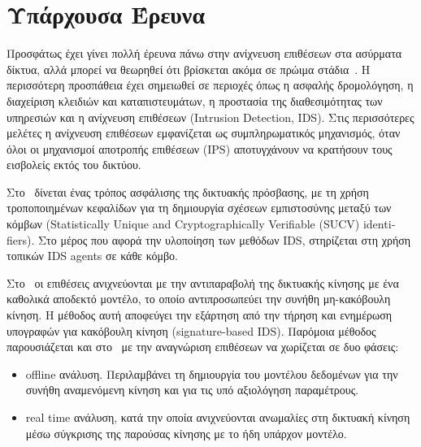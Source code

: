 \documentclass[12pt]{report}
\begin{document}
\section{Υπάρχουσα Έρευνα}
Προσφάτως έχει γίνει πολλή έρευνα πάνω στην ανίχνευση επιθέσεων στα ασύρματα δίκτυα, αλλά μπορεί να θεωρηθεί ότι βρίσκεται ακόμα σε πρώιμα στάδια~\cite{paper:03}. Η περισσότερη προσπάθεια έχει σημειωθεί σε περιοχές όπως η ασφαλής δρομολόγηση, η διαχείριση κλειδιών και καταπιστευμάτων, η προστασία της διαθεσιμότητας των υπηρεσιών και η ανίχνευση επιθέσεων (\textlatin{Intrusion Detection, IDS}). Στις περισσότερες μελέτες η ανίχνευση επιθέσεων εμφανίζεται ως συμπληρωματικός μηχανισμός, όταν όλοι οι μηχανισμοί αποτροπής επιθέσεων (\textlatin{IPS}) αποτυγχάνουν να κρατήσουν τους εισβολείς εκτός του δικτύου.

Στο~\cite{paper:01} δίνεται ένας τρόπος ασφάλισης της δικτυακής πρόσβασης, με τη χρήση τροποποιημένων κεφαλίδων για τη δημιουργία σχέσεων εμπιστοσύνης μεταξύ των κόμβων (\textlatin{Statistically Unique and Cryptographically Verifiable (SUCV) identifiers}). Στο μέρος που αφορά την υλοποίηση των μεθόδων \textlatin{IDS}, στηρίζεται στη χρήση τοπικών \textlatin{IDS agents} σε κάθε κόμβο.

Στο~\cite{paper:03} οι επιθέσεις ανιχνεύονται με την αντιπαραβολή της δικτυακής κίνησης με ένα καθολικά αποδεκτό μοντέλο, το οποίο αντιπροσωπεύει την συνήθη μη-κακόβουλη κίνηση. Η μέθοδος αυτή αποφεύγει την εξάρτηση από την τήρηση και ενημέρωση υπογραφών για κακόβουλη κίνηση (\textlatin{signature-based IDS}). Παρόμοια μέθοδος παρουσιάζεται και στο~\cite{paper:04} με την αναγνώριση επιθέσεων να χωρίζεται σε δυο φάσεις:
\begin{itemize}
  \item \textlatin{offline} ανάλυση. Περιλαμβάνει τη δημιουργία του μοντέλου δεδομένων για την συνήθη αναμενόμενη κίνηση και για τις υπό αξιολόγηση παραμέτρους.
  \item \textlatin{real time} ανάλυση, κατά την οποία ανιχνεύονται ανωμαλίες στη δικτυακή κίνηση μέσω σύγκρισης της παρούσας κίνησης με το ήδη υπάρχον μοντέλο.
\end{itemize}
\end{document}
